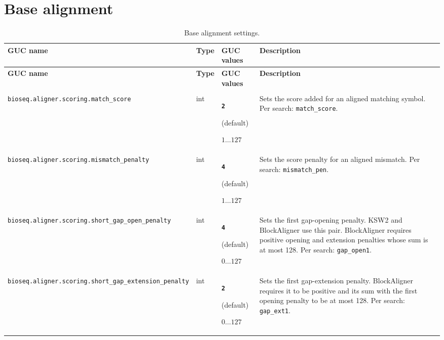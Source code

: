 \section{Base alignment}
\begingroup
\footnotesize
\setlength{\tabcolsep}{3pt}
\renewcommand{\arraystretch}{1.12}
\begin{longtable}{@{}>{\raggedright\arraybackslash}p{.27\linewidth}>{\raggedright\arraybackslash}p{.07\linewidth}>{\raggedright\arraybackslash}p{.22\linewidth}>{\raggedright\arraybackslash}p{}@{}}
\caption{Base alignment settings.}\label{tab:configuration-scoring}\\
\toprule
\textbf{GUC name} & \textbf{Type} & \textbf{GUC values} & \textbf{Description}\\
\midrule
\endfirsthead
\toprule
\textbf{GUC name} & \textbf{Type} & \textbf{GUC values} & \textbf{Description}\\
\midrule
\endhead
\midrule
\multicolumn{4}{r}{\textit{Continued on the next page}}\\
\endfoot
\bottomrule
\endlastfoot
\nolinkurl{bioseq.aligner.scoring.match_score} & int & {\bfseries \nolinkurl{2}}\par(default)\par $1\ldots 127$ & Sets the score added for an aligned matching symbol. Per search: \nolinkurl{match_score}.\\[4pt]
\midrule
\nolinkurl{bioseq.aligner.scoring.mismatch_penalty} & int & {\bfseries \nolinkurl{4}}\par(default)\par $1\ldots 127$ & Sets the score penalty for an aligned mismatch. Per search: \nolinkurl{mismatch_pen}.\\[4pt]
\midrule
\nolinkurl{bioseq.aligner.scoring.short_gap_open_penalty} & int & {\bfseries \nolinkurl{4}}\par(default)\par $0\ldots 127$ & Sets the first gap-opening penalty. KSW2 and BlockAligner use this pair. BlockAligner requires positive opening and extension penalties whose sum is at most 128. Per search: \nolinkurl{gap_open1}.\\[4pt]
\midrule
\nolinkurl{bioseq.aligner.scoring.short_gap_extension_penalty} & int & {\bfseries \nolinkurl{2}}\par(default)\par $0\ldots 127$ & Sets the first gap-extension penalty. BlockAligner requires it to be positive and its sum with the first opening penalty to be at most 128. Per search: \nolinkurl{gap_ext1}.\\[4pt]

\end{longtable}
